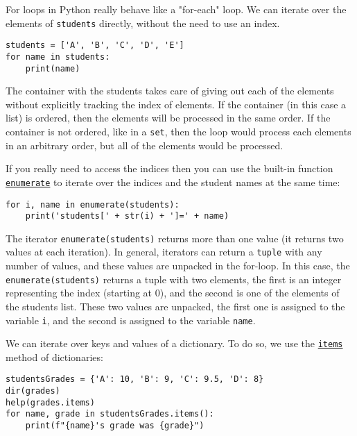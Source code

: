\documentclass[12pt, a4paper]{article}
\begin{document}
For loops in Python really behave like a "for-each" loop.
We can iterate over the elements of \texttt{students} directly, without the need to use an index.
\lstset{language=jupyter-python,label= ,caption= ,captionpos=b,numbers=none}
\begin{lstlisting}
students = ['A', 'B', 'C', 'D', 'E']
for name in students:
    print(name)
\end{lstlisting}
The container with the students takes care of giving out each of the elements without explicitly tracking the index of elements.
If the container (in this case a list) is ordered, then the elements will be processed in the same order.
If the container is not ordered, like in a \texttt{set}, then the loop would process each elements in an arbitrary order, but all of the elements would be processed.

If you really need to access the indices then you can use the built-in function \href{https://docs.python.org/3.6/library/functions.html\#enumerate}{\texttt{enumerate}} to iterate over the indices and the student names at the same time:
\lstset{language=jupyter-python,label= ,caption= ,captionpos=b,numbers=none}
\begin{lstlisting}
for i, name in enumerate(students):
    print('students[' + str(i) + ']=' + name)
\end{lstlisting}

The iterator \texttt{enumerate(students)} returns more than one value (it returns two values at each iteration). In general, iterators can return a \texttt{tuple} with any number of values, and these values are unpacked in the for-loop. In this case, the \texttt{enumerate(students)} returns a tuple with two elements, the first is an integer representing the index (starting at 0), and the second is one of the elements of the students list.
These two values are unpacked, the first one is assigned to the variable \texttt{i}, and the second is assigned to the variable \texttt{name}.

We can iterate over keys and values of a dictionary.
To do so, we use the \href{https://docs.python.org/3.6/library/stdtypes.html?highlight=dict.items\#dict.items}{\texttt{items}} method of dictionaries:
\lstset{language=jupyter-python,label= ,caption= ,captionpos=b,numbers=none}
\begin{lstlisting}
studentsGrades = {'A': 10, 'B': 9, 'C': 9.5, 'D': 8}
dir(grades)
help(grades.items)
for name, grade in studentsGrades.items():
    print(f"{name}'s grade was {grade}")
\end{lstlisting}
\end{document}
